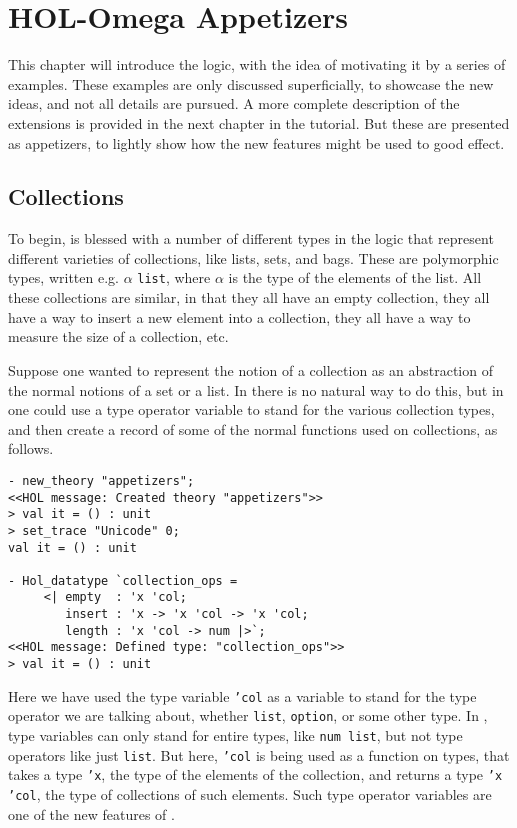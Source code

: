\chapter{HOL-Omega Appetizers}\label{chap:appetizers}

This chapter will introduce the \HOLW{} logic, with the idea of
motivating it by a series of examples.  These examples are
only discussed superficially, to showcase the new ideas,
and not all details are pursued.
A more complete description of the \HOLW{} extensions is provided in
the next chapter in the tutorial.
But these are presented as appetizers,
to lightly show how the new features might be used to good effect.


\section{Collections}

To begin, \HOL{} is blessed with a number of different types in the logic that
represent different varieties of collections, like lists, sets, and bags. These
are polymorphic types, written e.g. $\alpha$ {\tt list}, where $\alpha$ is the
type of the elements of the list. All these collections are similar, in that they
all have an empty collection, they all have a way to insert a new element into
a collection, they all have a way to measure the size of a collection, etc.

Suppose one wanted to represent the notion of a collection as an abstraction
of the normal notions of a set or a list.  In \HOL{} there is no natural way to
do this, but in \HOLW{} one could use a type operator variable to stand for the
various collection types, and then create a record of some of
the normal functions used on collections, as follows.

\begin{session}
\begin{verbatim}
- new_theory "appetizers";
<<HOL message: Created theory "appetizers">>
> val it = () : unit
> set_trace "Unicode" 0;
val it = () : unit

- Hol_datatype `collection_ops =
     <| empty  : 'x 'col;
        insert : 'x -> 'x 'col -> 'x 'col;
        length : 'x 'col -> num |>`;
<<HOL message: Defined type: "collection_ops">>
> val it = () : unit
\end{verbatim}
\end{session}
Here we have used the type variable \texttt{'col} as a variable
to stand for the type operator we are talking about, whether \texttt{list},
\texttt{option}, or some other type.
In \HOL, type variables can only stand for entire types, like \texttt{num list},
but not type operators like just \texttt{list}.
But here, \texttt{'col} is being used as a function on types,
that takes a type \texttt{'x}, the type of the elements of the collection,
and returns a type \texttt{'x 'col}, the type of collections of such elements.
Such type operator variables are one of the new features of \HOLW{}.

